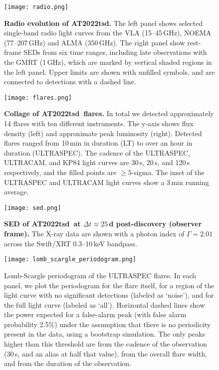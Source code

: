 \documentclass{nature_plusfigure}
\newcommand{\at}{AT2022tsd}
\begin{document}
\begin{extended_data}
\begin{figure}[!ht]
 \centering
\texttt{[image: radio.png]}
  \caption{\textbf{Radio evolution of \at.} The left panel shows selected single-band radio light curves from the VLA (15--45\,GHz), NOEMA (77--207\,GHz) and ALMA ($350$\,GHz). The right panel show rest-frame SEDs from six time ranges, including late observations with the GMRT (1\,GHz), which are marked by vertical shaded regions in the left panel. Upper limits are shown with unfilled symbols, and are connected to detections with a dashed line.}
 \label{fig:radio}
\end{figure}

\begin{figure}[ht]
 \centering
\texttt{[image: flares.png]}
  \caption{\textbf{Collage of \at\ flares.} In total we detected approximately 14 flares with ten different instruments. The y-axis shows flux density (left) and approximate peak luminosity (right). Detected flares ranged from 10\,min in duration (LT) to over an hour in duration (ULTRASPEC). The cadence of the ULTRASPEC, ULTRACAM, and KP84 light curves are 30\,s, 20\,s, and 120\,s respectively, and the filled points are $\geq5$-sigma. The inset of the ULTRASPEC and ULTRACAM light curves show a 3\,min running average.}
 \label{fig:flare-collage}
\end{figure}

\begin{figure}[!ht]
 \centering
\texttt{[image: sed.png]}
  \caption{\textbf{SED of \at\ at $\Delta t\approx25\,$d post-discovery (observer frame).} The X-ray data are shown with a photon index of $\Gamma=2.01$ across the Swift/XRT 0.3--10\,keV bandpass.}
 \label{fig:full-sed}
\end{figure}

\begin{figure*}[ht]
    \centering
    \texttt{[image: lomb\_scargle\_periodogram.png]}
    \caption{Lomb-Scargle periodogram of the ULTRASPEC flares. In each panel, we plot the periodogram for the flare itself, for a region of the light curve with no significant detections (labeled as `noise'), and for the full light curve (labeled as `all'). Horizontal dashed lines show the power expected for a false-alarm peak (with false alarm probability 2.5\%) under the assumption that there is no periodicity present in the data, using a bootstrap simulation. The only peaks higher than this threshold are from the cadence of the observation (30\,s, and an alias at half that value), from the overall flare width, and from the duration of the observation.}
    \label{fig:ultraspec-periodogram}
\end{figure*}


\end{extended_data}
\end{document}
